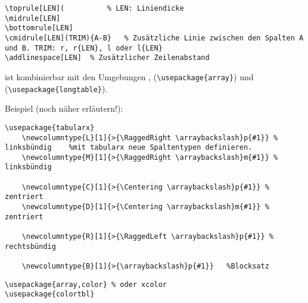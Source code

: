 \begin{lstlisting}
\toprule[LEN](			% LEN: Liniendicke
\midrule[LEN]
\bottomrule[LEN]
\cmidrule[LEN](TRIM){A-B}	% Zusätzliche Linie zwischen den Spalten A und B. TRIM: r, r{LEN}, l oder l{LEN}
\addlinespace[LEN]	% Zusätzlicher Zeilenabstand
\end{lstlisting}

 ist kombinierbar mit den Umgebungen , (\verb|\usepackage{array}|) und  (\verb|\usepackage{longtable}|).

{}
Beispiel (noch näher erläutern!):
\begin{lstlisting}
\usepackage{tabularx}
	\newcolumntype{L}[1]{>{\RaggedRight \arraybackslash}p{#1}} % linksbündig	%mit tabularx neue Spaltentypen definieren.
	\newcolumntype{M}[1]{>{\RaggedRight \arraybackslash}m{#1}} % linksbündig
	
	\newcolumntype{C}[1]{>{\Centering \arraybackslash}p{#1}} % zentriert
	\newcolumntype{D}[1]{>{\Centering \arraybackslash}m{#1}} % zentriert
		
	\newcolumntype{R}[1]{>{\RaggedLeft \arraybackslash}p{#1}} % rechtsbündig
	
	\newcolumntype{B}[1]{>{\arraybackslash}p{#1}}	%Blocksatz
\end{lstlisting}

\negAbstand

\negAbstand
\begin{lstlisting}
\usepackage{array,color} % oder xcolor
\usepackage{colortbl}
\end{lstlisting}

\negAbstand\negAbstand


